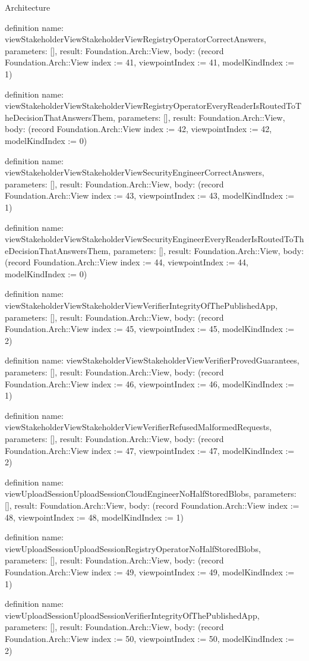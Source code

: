 \begin{lexlean}{Architecture}
\begin{semanticmodule}
definition{
  name: viewStakeholderViewStakeholderViewRegistryOperatorCorrectAnswers,
  parameters: [],
  result: Foundation.Arch::View,
  body: (record Foundation.Arch::View {index := 41, viewpointIndex := 41, modelKindIndex := 1})
}

definition{
  name: viewStakeholderViewStakeholderViewRegistryOperatorEveryReaderIsRoutedToTheDecisionThatAnswersThem,
  parameters: [],
  result: Foundation.Arch::View,
  body: (record Foundation.Arch::View {index := 42, viewpointIndex := 42, modelKindIndex := 0})
}

definition{
  name: viewStakeholderViewStakeholderViewSecurityEngineerCorrectAnswers,
  parameters: [],
  result: Foundation.Arch::View,
  body: (record Foundation.Arch::View {index := 43, viewpointIndex := 43, modelKindIndex := 1})
}

definition{
  name: viewStakeholderViewStakeholderViewSecurityEngineerEveryReaderIsRoutedToTheDecisionThatAnswersThem,
  parameters: [],
  result: Foundation.Arch::View,
  body: (record Foundation.Arch::View {index := 44, viewpointIndex := 44, modelKindIndex := 0})
}

definition{
  name: viewStakeholderViewStakeholderViewVerifierIntegrityOfThePublishedApp,
  parameters: [],
  result: Foundation.Arch::View,
  body: (record Foundation.Arch::View {index := 45, viewpointIndex := 45, modelKindIndex := 2})
}

definition{
  name: viewStakeholderViewStakeholderViewVerifierProvedGuarantees,
  parameters: [],
  result: Foundation.Arch::View,
  body: (record Foundation.Arch::View {index := 46, viewpointIndex := 46, modelKindIndex := 1})
}

definition{
  name: viewStakeholderViewStakeholderViewVerifierRefusedMalformedRequests,
  parameters: [],
  result: Foundation.Arch::View,
  body: (record Foundation.Arch::View {index := 47, viewpointIndex := 47, modelKindIndex := 2})
}

definition{
  name: viewUploadSessionUploadSessionCloudEngineerNoHalfStoredBlobs,
  parameters: [],
  result: Foundation.Arch::View,
  body: (record Foundation.Arch::View {index := 48, viewpointIndex := 48, modelKindIndex := 1})
}

definition{
  name: viewUploadSessionUploadSessionRegistryOperatorNoHalfStoredBlobs,
  parameters: [],
  result: Foundation.Arch::View,
  body: (record Foundation.Arch::View {index := 49, viewpointIndex := 49, modelKindIndex := 1})
}

definition{
  name: viewUploadSessionUploadSessionVerifierIntegrityOfThePublishedApp,
  parameters: [],
  result: Foundation.Arch::View,
  body: (record Foundation.Arch::View {index := 50, viewpointIndex := 50, modelKindIndex := 2})
}


\end{semanticmodule}
\end{lexlean}
